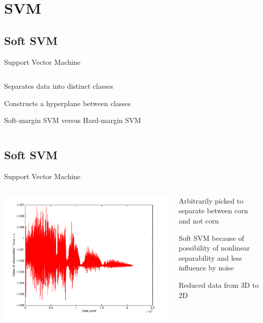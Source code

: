 \documentclass[11pt]{beamer}
\begin{document}

\section{SVM}
\subsection{Soft SVM}
\begin{frame}{Support Vector Machine}
\begin{columns}[T]
\begin{column}{.48\textwidth}
\item Separates data into distinct classes
\item Constructs a hyperplane between classes
\item Soft-margin SVM versus Hard-margin SVM
\end{column}
\hfill
\begin{column}{.48\textwidth}
\end{column}
\end{columns}
\end{frame}

\subsection{Soft SVM}
\begin{frame}{Support Vector Machine}
\begin{columns}[T]
\begin{column}{.48\textwidth}
\includegraphics[scale=.3]{softsvmImage.png}
\end{column}
\hfill
\begin{column}{.48\textwidth}
\item Arbitrarily picked to separate between corn and not corn
\item Soft SVM because of possibility of nonlinear separability and less influence by noise
\item Reduced data from 3D to 2D
\end{column}
\end{columns}
\end{frame}
\end{document}
